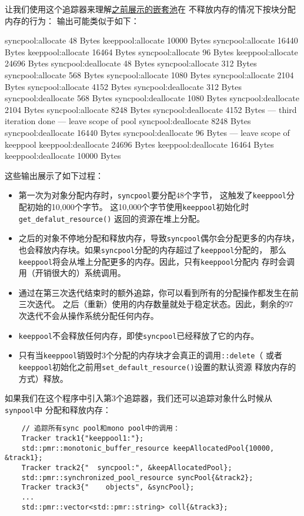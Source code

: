 让我们使用这个追踪器来理解\hyperref[嵌套池]{之前展示的嵌套池}在
不释放内存的情况下按块分配内存的行为：\label{追踪嵌套池的allocation}
输出可能类似于如下：
\begin{blacklisting}
      syncpool:allocate 48 Bytes
    keeppool:allocate 10000 Bytes
      syncpool:allocate 16440 Bytes
    keeppool:allocate 16464 Bytes
      syncpool:allocate 96 Bytes
    keeppool:allocate 24696 Bytes
      syncpool:deallocate 48 Bytes
      syncpool:allocate 312 Bytes
      syncpool:allocate 568 Bytes
      syncpool:allocate 1080 Bytes
      syncpool:allocate 2104 Bytes
      syncpool:allocate 4152 Bytes
      syncpool:deallocate 312 Bytes
      syncpool:deallocate 568 Bytes
      syncpool:deallocate 1080 Bytes
      syncpool:deallocate 2104 Bytes
      syncpool:allocate 8248 Bytes
      syncpool:deallocate 4152 Bytes
    --- third iteration done
    --- leave scope of pool
      syncpool:deallocate 8248 Bytes
      syncpool:deallocate 16440 Bytes
      syncpool:deallocate 96 Bytes
    --- leave scope of keeppool
    keeppool:deallocate 24696 Bytes
    keeppool:deallocate 16464 Bytes
    keeppool:deallocate 10000 Bytes
\end{blacklisting}
这些输出展示了如下过程：
\begin{itemize}
    \item 第一次为对象分配内存时，\texttt{syncpool}要分配48个字节，
    这触发了\texttt{keeppool}分配初始的10,000个字节。
    这10,000个字节使用\texttt{keeppool}初始化时\texttt{get\_defalut\_resource()}
    返回的资源在堆上分配。
    \item 之后的对象不停地分配和释放内存，导致\texttt{syncpool}偶尔会分配更多的内存块，
    也会释放内存块。如果\texttt{syncpool}分配的内存超过了\texttt{keeppool}分配的，
    那么\texttt{keeppool}将会从堆上分配更多的内存。因此，只有\texttt{keeppool}分配内
    存时会调用（开销很大的）系统调用。
    \item 通过在第三次迭代结束时的额外追踪，你可以看到所有的分配操作都发生在前三次迭代。
    之后（重新）使用的内存数量就处于稳定状态。因此，剩余的97次迭代不会从操作系统分配任何内存。
    \item \texttt{keeppool}不会释放任何内存，即使\texttt{syncpool}已经释放了它的内存。
    \item 只有当\texttt{keeppool}销毁时3个分配的内存块才会真正的调用\texttt{::delete}（
    或者\texttt{keeppool}初始化之前用\texttt{set\_default\_resource()}设置的默认资源
    释放内存的方式）释放。
\end{itemize}
如果我们在这个程序中引入第3个追踪器，我们还可以追踪对象什么时候从\texttt{synpool}中
分配和释放内存：
\begin{lstlisting}
    // 追踪所有sync pool和mono pool中的调用：
    Tracker track1{"keeppool1:"};
    std::pmr::monotonic_buffer_resource keepAllocatedPool{10000, &track1};
    Tracker track2{"  syncpool:", &keepAllocatedPool};
    std::pmr::synchronized_pool_resource syncPool{&track2};
    Tracker track3{"    objects", &syncPool};
    ...
    std::pmr::vector<std::pmr::string> coll{&track3};
\end{lstlisting}

